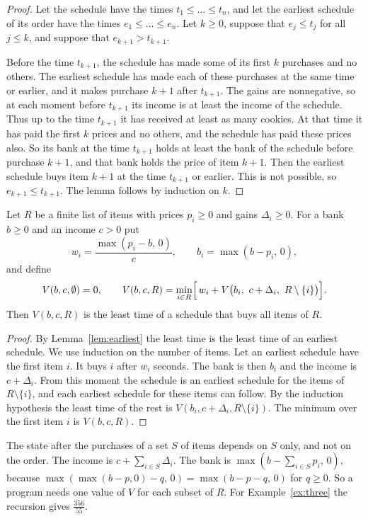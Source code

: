 \documentclass[11pt]{article}
\theoremstyle{boxed}
\begin{document}
\begin{proof}
Let the schedule have the times $t_1\le\dots\le t_n$, and let the earliest schedule of its order
have the times $e_1\le\dots\le e_n$. Let $k\ge0$, suppose that $e_j\le t_j$ for all $j\le k$, and
suppose that $e_{k+1}>t_{k+1}$.

Before the time $t_{k+1}$, the schedule has made some of its first $k$ purchases and no others.
The earliest schedule has made each of these purchases at the same time or earlier, and it
makes purchase $k+1$ after $t_{k+1}$. The gains are nonnegative, so at each moment before
$t_{k+1}$ its income is at least the income of the schedule. Thus up to the time $t_{k+1}$ it has
received at least as many cookies. At that time it has paid the first $k$ prices and no others,
and the schedule has paid these prices also. So its bank at the time $t_{k+1}$ holds at least
the bank of the schedule before purchase $k+1$, and that bank holds the price of item $k+1$.
Then the earliest schedule buys item $k+1$ at the time $t_{k+1}$ or earlier. This is not
possible, so $e_{k+1}\le t_{k+1}$. The lemma follows by induction on $k$.
\end{proof}

\begin{theorem}\label{thm:list}
Let $R$ be a finite list of items with prices $p_i\ge0$ and gains $\Delta_i\ge0$. For a bank
$b\ge0$ and an income $c>0$ put
\[
  w_i=\frac{\max(p_i-b,\,0)}{c},\qquad b_i=\max(b-p_i,\,0),
\]
and define
\[
  V(b,c,\emptyset)=0,\qquad
  V(b,c,R)=\min_{i\in R}\Bigl[\,w_i+V\bigl(b_i,\ c+\Delta_i,\ R\setminus\{i\}\bigr)\Bigr].
\]
Then $V(b,c,R)$ is the least time of a schedule that buys all items of $R$.
\end{theorem}

\begin{proof}
By Lemma~\ref{lem:earliest} the least time is the least time of an earliest schedule. We use
induction on the number of items. Let an earliest schedule have the first item $i$. It buys $i$
after $w_i$ seconds. The bank is then $b_i$ and the income is $c+\Delta_i$. From this moment the
schedule is an earliest schedule for the items of $R\setminus\{i\}$, and each earliest schedule
for these items can follow. By the induction hypothesis the least time of the rest is
$V(b_i,c+\Delta_i,R\setminus\{i\})$. The minimum over the first item $i$ is $V(b,c,R)$.
\end{proof}

The state after the purchases of a set $S$ of items depends on $S$ only, and not on the order.
The income is $c+\sum_{i\in S}\Delta_i$. The bank is $\max(b-\sum_{i\in S}p_i,\,0)$, because
$\max(\max(b-p,0)-q,\,0)=\max(b-p-q,\,0)$ for $q\ge0$. So a program needs one value of $V$ for
each subset of $R$. For Example~\ref{ex:three} the recursion gives $\frac{356}{55}$.
\end{document}
